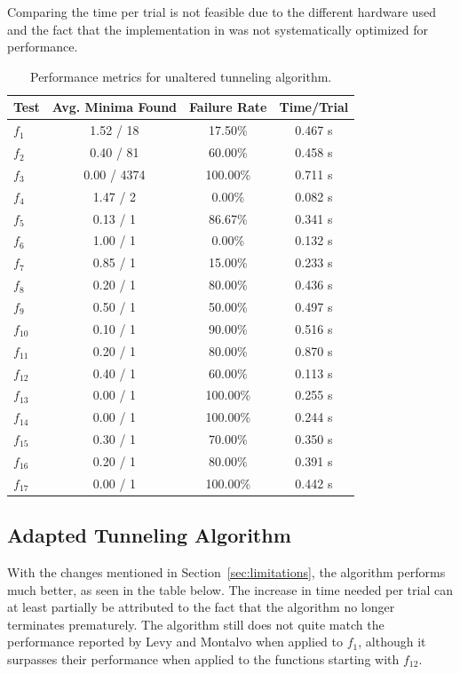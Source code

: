 \documentclass[a4paper,12pt,twoside]{article}
\begin{document}
Comparing the time per trial is not feasible due to the different hardware used and the fact that the implementation in \cite{heidbrink_nicolasheidbrinkoptimization-seminar_2026} was not systematically optimized for performance.  
\begin{table}[H]
    \centering
    \begin{tabular}{lccc}
        \hline
        \textbf{Test} & \textbf{Avg. Minima Found} & \textbf{Failure Rate} & \textbf{Time/Trial} \\
        \hline
        $f_1$ & 1.52 / 18 & 17.50\% & 0.467 s \\
        $f_2$ & 0.40 / 81 & 60.00\% & 0.458 s \\
        $f_3$ & 0.00 / 4374 & 100.00\% & 0.711 s \\
        $f_4$ & 1.47 / 2 & 0.00\% & 0.082 s \\
        $f_5$ & 0.13 / 1 & 86.67\% & 0.341 s \\
        $f_6$ & 1.00 / 1 & 0.00\% & 0.132 s \\
        $f_7$ & 0.85 / 1 & 15.00\% & 0.233 s \\
        $f_8$ & 0.20 / 1 & 80.00\% & 0.436 s \\
        $f_9$ & 0.50 / 1 & 50.00\% & 0.497 s \\
        $f_{10}$ & 0.10 / 1 & 90.00\% & 0.516 s \\
        $f_{11}$ & 0.20 / 1 & 80.00\% & 0.870 s \\
        $f_{12}$ & 0.40 / 1 & 60.00\% & 0.113 s \\
        $f_{13}$ & 0.00 / 1 & 100.00\% & 0.255 s \\
        $f_{14}$ & 0.00 / 1 & 100.00\% & 0.244 s \\
        $f_{15}$ & 0.30 / 1 & 70.00\% & 0.350 s \\
        $f_{16}$ & 0.20 / 1 & 80.00\% & 0.391 s \\
        $f_{17}$ & 0.00 / 1 & 100.00\% & 0.442 s \\
        \hline
    \end{tabular}
    \caption{Performance metrics for unaltered tunneling algorithm.}
    \label{tab:unaltered}
\end{table}


\subsection{Adapted Tunneling Algorithm} \label{sec:adapted}

With the changes mentioned in Section~\ref{sec:limitations}, the algorithm performs much better, as seen in the table below. The increase in time needed per trial can at least partially be attributed to the fact that the algorithm no longer terminates prematurely. The algorithm still does not quite match the performance reported by Levy and Montalvo when applied to $f_1$, although it surpasses their performance when applied to the functions starting with $f_{12}$.
\end{document}

